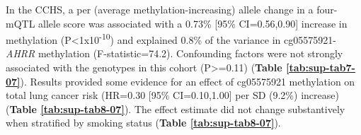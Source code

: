 \documentclass[11pt,oneside]{bristolthesis}
\begin{document}
In the CCHS, a per (average methylation-increasing) allele change in a four-mQTL allele score was associated with a 0.73\% {[}95\% CI=0.56,0.90{]} increase in methylation (P\textless1x10\textsuperscript{-10}) and explained 0.8\% of the variance in cg05575921-\emph{AHRR} methylation (F-statistic=74.2). Confounding factors were not strongly associated with the genotypes in this cohort (P\textgreater=0.11) (\textbf{Table \ref{tab:sup-tab7-07}}). Results provided some evidence for an effect of cg05575921 methylation on total lung cancer risk (HR=0.30 {[}95\% CI=0.10,1.00{]} per SD (9.2\%) increase) (\textbf{Table \ref{tab:sup-tab8-07}}). The effect estimate did not change substantively when stratified by smoking status (\textbf{Table \ref{tab:sup-tab8-07}}). \linebreak
\begin{table}[!h]


\end{table}
\end{document}
